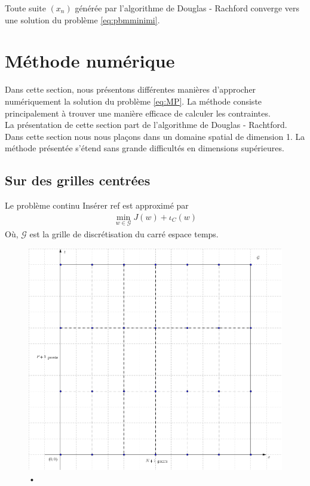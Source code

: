 \documentclass[a4paper,12pt]{article}
\begin{document}
\begin{propriete}
Toute suite $(x_n)$ générée par l'algorithme de Douglas - Rachford converge vers une solution du problème \ref{eq:pbmminimi}.
\end{propriete}








\newpage

\section{Méthode numérique}
\label{sec:numerique}
Dans cette section, nous présentons différentes manières d'approcher numériquement la solution du problème \eqref{eq:MP}. La méthode consiste principalement à trouver une manière efficace de calculer les contraintes. \\

La présentation de cette section part de l'algorithme de Douglas - Rachtford. \\

Dans cette section nous nous plaçons dans un domaine spatial de dimension 1. La méthode présentée s'étend sans grande difficultés en dimensions supérieures. 


\subsection{Sur des grilles centrées}
Le problème continu {\Huge Insérer ref} est approximé par 
\begin{align}
\min_{w\in\mathcal{G}} J(w) + \iota_C(w)
\end{align}
Où, $\mathcal{G}$ est la grille de discrétisation du carré espace temps. 

\begin{figure}[!h]
\centering
\includegraphics[width=0.8\linewidth]{img/grille_centree.png}
\caption{•}
\end{figure}
\end{document}
